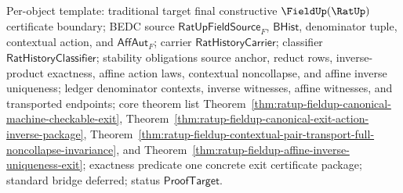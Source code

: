 Per-object template: traditional target final constructive
$\FieldUp(\RatUp)$ certificate boundary; BEDC source
$\mathsf{RatUpFieldSource}_F$, $\mathsf{BHist}$, denominator tuple, contextual
action, and $\mathsf{AffAut}_F$; carrier $\mathsf{RatHistoryCarrier}$;
classifier $\mathsf{RatHistoryClassifier}$; stability obligations source anchor,
reduct rows, inverse-product exactness, affine action laws, contextual
noncollapse, and affine inverse uniqueness; ledger denominator contexts, inverse
witnesses, affine witnesses, and transported endpoints; core theorem list
Theorem~\ref{thm:ratup-fieldup-canonical-machine-checkable-exit},
Theorem~\ref{thm:ratup-fieldup-canonical-exit-action-inverse-package},
Theorem~\ref{thm:ratup-fieldup-contextual-pair-transport-full-noncollapse-invariance},
and Theorem~\ref{thm:ratup-fieldup-affine-inverse-uniqueness-exit}; exactness
predicate one concrete exit certificate package; standard bridge deferred;
status $\mathsf{ProofTarget}$.

